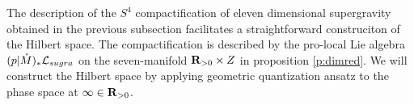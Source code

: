 



%
%
%
%
%
\parsec[s:hilbertspace]
The description of the $S^{4}$ compactification of eleven dimensional supergravity obtained in the previous subsection facilitates a straightforward construciton of the Hilbert space. The compactification is described by the pro-local Lie algebra $(p|\mathring M)_{*} \mathcal L_{sugra}$ on the seven-manifold $\mathbf{R}_{>0}\times Z$ in proposition \ref{p:dimred}. We will construct the Hilbert space by applying geometric quantization ansatz to the phase space at $\infty \in \mathbf{R}_{>0}$.


